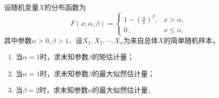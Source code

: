 \documentclass[plain,noanswer,medmath]{../../template/jnuexam}
\begin{document}
\begin{problem}[points=13]%
设随机变量$X$的分布函数为
$$F(x;\alpha ,\beta) = \begin{cases}
  1 - \left(\frac{\alpha}{x} \right)^{\beta}, & x > \alpha , \\
                                           0, & x \le \alpha ,
\end{cases}$$
其中参数$\alpha > 0,\beta > 1$．设$X_1,X_2, \cdots ,X_n$为来自总体$X$的简单随机样本，
\begin{enumerate}
\item 当$\alpha = 1$时，求未知参数$\beta$的矩估计量；
\item 当$\alpha = 1$时，求未知参数$\beta$的最大似然估计量；
\item 当$\beta = 2$时，求未知参数$\alpha$的最大似然估计量．
\end{enumerate}
\end{problem}
\end{document}
